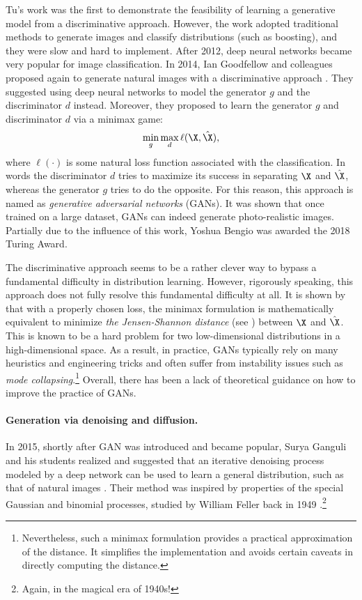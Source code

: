 \documentclass[../../book-main.tex]{subfiles}
\begin{document}
Tu's work \cite{Tu-2007} was the first to demonstrate the feasibility of learning a generative model from a discriminative approach. However, the work adopted traditional methods to generate images and classify distributions (such as boosting), and they were slow and hard to implement. After 2012, deep neural networks became very popular for image classification. In 2014, Ian Goodfellow and colleagues proposed again to generate natural images with a discriminative approach \cite{Goodfellow-2014}. They suggested using deep neural networks to model the generator $g$ and the discriminator $d$ instead. Moreover, they proposed to learn the generator $g$ and discriminator $d$ via a minimax game:
\begin{equation}
    \min_g \max_d \ell(\X, \hat \X),
\end{equation}
where $\ell(\cdot)$ is some natural loss function associated with the classification.  In words the discriminator $d$ tries to maximize its success in separating $\X$ and $\hat \X$, whereas the generator $g$ tries to do the opposite. For this reason, this approach is named as {\em generative adversarial networks} (GANs). It was shown that once trained on a large dataset, GANs can indeed generate photo-realistic images. Partially due to the influence of this work, Yoshua Bengio was awarded the 2018 Turing Award.

The discriminative approach seems to be a rather clever way to bypass a fundamental difficulty in distribution learning. However, rigorously speaking, this approach does not fully resolve this fundamental difficulty at all. It is shown by  \cite{Goodfellow-2014} that with a properly chosen loss, the minimax formulation is mathematically equivalent to minimize {\em the Jensen-Shannon distance} (see \cite{Cover-Thomas}) between $\X$ and $\hat \X$. This is known to be a hard problem for two low-dimensional distributions in a high-dimensional space. As a result, in practice, GANs typically rely on many heuristics and engineering tricks and often suffer from instability issues such as {\em mode collapsing}.\footnote{Nevertheless, such a minimax formulation provides a practical approximation of the distance. It simplifies the implementation and avoids certain caveats in directly computing the distance.} Overall, there has been a lack of theoretical guidance on how to improve the practice of GANs.

\paragraph{Generation via denoising and diffusion.}
In 2015, shortly after GAN was introduced and became popular, Surya Ganguli and his students realized and suggested that an iterative denoising process modeled by a deep network can be used to learn a general distribution, such as that of natural images \cite{Sohl-Dickstein2015}. Their method was inspired by properties of the special Gaussian and binomial processes, studied by William Feller back in 1949 \cite{Feller1949OnTT}.\footnote{Again, in the magical era of 1940s!} 
\end{document}
